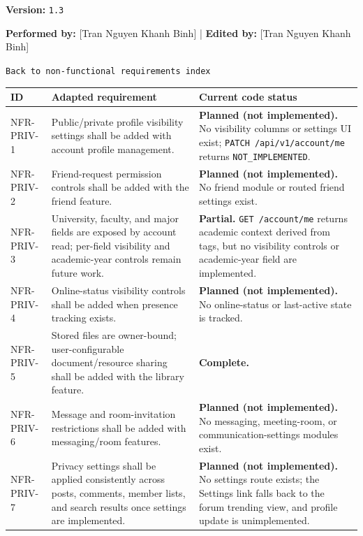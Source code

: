 \documentclass[12pt]{article}
\renewcommand{\baselinestretch}{1.5}
\begin{document}
\textbf{Version:} \texttt{1.3}
\par\medskip

\textbf{Performed by:} [Tran Nguyen Khanh Binh] | \textbf{Edited by:} [Tran Nguyen Khanh Binh]
\par\medskip

\texttt{Back to non-functional requirements index}
\par\medskip

\begingroup
\small
\renewcommand{\baselinestretch}{1.0}\selectfont
\renewcommand{\arraystretch}{1.15}
\setlength{\tabcolsep}{6pt}
\begin{longtable}{|>{\raggedright\arraybackslash}p{}|>{\raggedright\arraybackslash}p{}|>{\raggedright\arraybackslash}p{}|}
\hline
\textbf{ID} & \textbf{Adapted requirement} & \textbf{Current code status} \\ \hline
\endhead
NFR-PRIV-1 & Public/private profile visibility settings shall be added with account profile management. & \textbf{Planned (not implemented).} No visibility columns or settings UI exist; \texttt{PATCH /api/v1/account/me} returns \texttt{NOT\_IMPLEMENTED}. \\ \hline
NFR-PRIV-2 & Friend-request permission controls shall be added with the friend feature. & \textbf{Planned (not implemented).} No friend module or routed friend settings exist. \\ \hline
NFR-PRIV-3 & University, faculty, and major fields are exposed by account read; per-field visibility and academic-year controls remain future work. & \textbf{Partial.} \texttt{GET /account/me} returns academic context derived from tags, but no visibility controls or academic-year field are implemented. \\ \hline
NFR-PRIV-4 & Online-status visibility controls shall be added when presence tracking exists. & \textbf{Planned (not implemented).} No online-status or last-active state is tracked. \\ \hline
NFR-PRIV-5 & Stored files are owner-bound; user-configurable document/resource sharing shall be added with the library feature. & \textbf{Complete.} \\ \hline
NFR-PRIV-6 & Message and room-invitation restrictions shall be added with messaging/room features. & \textbf{Planned (not implemented).} No messaging, meeting-room, or communication-settings modules exist. \\ \hline
NFR-PRIV-7 & Privacy settings shall be applied consistently across posts, comments, member lists, and search results once settings are implemented. & \textbf{Planned (not implemented).} No settings route exists; the Settings link falls back to the forum trending view, and profile update is unimplemented. \\ \hline
\end{longtable}
\endgroup
\par\medskip
\end{document}
